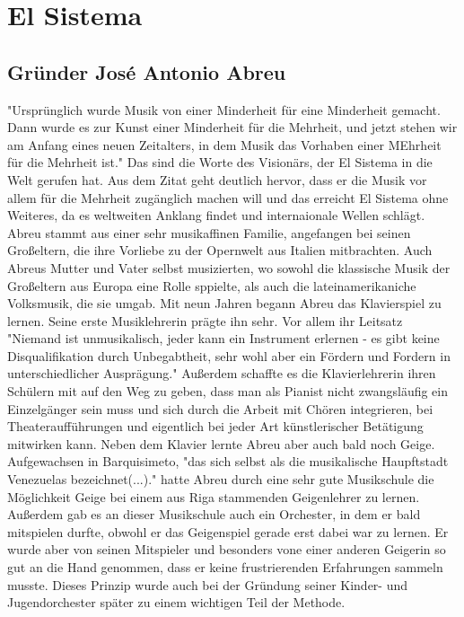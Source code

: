 \section{El Sistema}

\subsection{Gründer José Antonio Abreu}
"Ursprünglich wurde Musik von einer Minderheit für eine Minderheit gemacht. Dann
wurde es zur Kunst einer Minderheit für die Mehrheit, und jetzt stehen wir am
Anfang eines neuen Zeitalters, in dem Musik das Vorhaben einer MEhrheit für die
Mehrheit ist." \autocite[5]{kaufmann:el_sistema}
Das sind die Worte des Visionärs, der El Sistema in die Welt gerufen hat. Aus
dem Zitat geht deutlich hervor, dass er die Musik vor allem für die Mehrheit
zugänglich machen will und das erreicht El Sistema ohne Weiteres, da es
weltweiten Anklang findet und internaionale Wellen schlägt.
Abreu stammt aus einer sehr musikaffinen Familie, angefangen bei seinen
Großeltern, die ihre Vorliebe zu der Opernwelt aus Italien mitbrachten. Auch
Abreus Mutter und Vater selbst musizierten, wo sowohl die klassische Musik der
Großeltern aus Europa eine Rolle sppielte, als auch die lateinamerikaniche
Volksmusik, die sie umgab. Mit neun Jahren begann Abreu das Klavierspiel zu
lernen. Seine erste Musiklehrerin prägte ihn sehr. Vor allem ihr Leitsatz
"Niemand ist unmusikalisch, jeder kann ein Instrument erlernen - es gibt keine
Disqualifikation durch Unbegabtheit, sehr wohl aber ein Fördern und Fordern in
unterschiedlicher Ausprägung." \autocite[20]{kaufmann:el_sistema} Außerdem
schaffte es die Klavierlehrerin ihren Schülern mit auf den Weg zu geben, dass
man als Pianist nicht zwangsläufig ein Einzelgänger sein muss und sich durch die
Arbeit mit Chören integrieren, bei Theateraufführungen und eigentlich bei jeder
Art künstlerischer Betätigung mitwirken kann. Neben dem
Klavier lernte Abreu aber auch bald noch Geige.
Aufgewachsen in Barquisimeto, "das sich selbst als die musikalische Haupftstadt
Venezuelas bezeichnet(...)." \autocite[22]{kaufmann:el_sistema} hatte Abreu
durch eine sehr gute Musikschule die Möglichkeit Geige bei einem aus Riga
stammenden Geigenlehrer zu lernen. Außerdem gab es an dieser Musikschule auch
ein Orchester, in dem er bald mitspielen durfte, obwohl er das Geigenspiel
gerade erst dabei war zu lernen. Er wurde aber von seinen Mitspieler und
besonders vone einer anderen Geigerin so gut an
die Hand genommen, dass er keine frustrierenden Erfahrungen sammeln musste.
Dieses Prinzip wurde auch bei der Gründung seiner Kinder- und Jugendorchester
später zu einem wichtigen Teil der Methode. 


